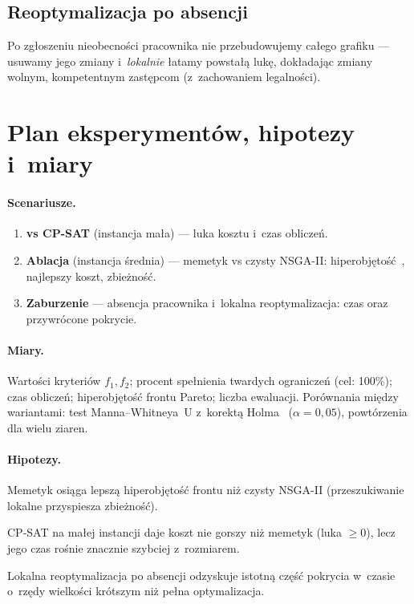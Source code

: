 \documentclass[11pt,a4paper]{article}
\begin{document}
\subsection{Reoptymalizacja po absencji}
Po zg\l oszeniu nieobecno\'sci pracownika nie przebudowujemy ca\l ego grafiku ---
usuwamy jego zmiany i~\emph{lokalnie} \l atamy powsta\l \k{a} luk\k{e}, dok\l adaj\k{a}c
zmiany wolnym, kompetentnym zast\k{e}pcom (z~zachowaniem legalno\'sci).

\section{Plan eksperyment\'ow, hipotezy i~miary}
\label{sec:plan}

\paragraph{Scenariusze.}
\begin{enumerate}[noitemsep]
  \item \textbf{vs CP-SAT} (instancja ma\l a) --- luka kosztu i~czas oblicze\'n.
  \item \textbf{Ablacja} (instancja \'srednia) --- memetyk vs czysty NSGA-II:
        hiperobj\k{e}to\'s\'c~\cite{zitzler2003hypervolume}, najlepszy koszt, zbie\.zno\'s\'c.
  \item \textbf{Zaburzenie} --- absencja pracownika i~lokalna reoptymalizacja:
        czas oraz przywr\'ocone pokrycie.
\end{enumerate}

\paragraph{Miary.} Warto\'sci kryteri\'ow $f_1,f_2$; procent spe\l nienia twardych
ogranicze\'n (cel: 100\%); czas oblicze\'n; hiperobj\k{e}to\'s\'c frontu Pareto;
liczba ewaluacji. Por\'ownania mi\k{e}dzy wariantami: test Manna--Whitneya~U
z~korekt\k{a} Holma~\cite{holm1979simple} ($\alpha=0{,}05$), powt\'orzenia dla wielu ziaren.

\paragraph{Hipotezy.}
\begin{description}[noitemsep]
  \item[H1] Memetyk osi\k{a}ga lepsz\k{a} hiperobj\k{e}to\'s\'c frontu ni\.z czysty
    NSGA-II (przeszukiwanie lokalne przyspiesza zbie\.zno\'s\'c).
  \item[H2] CP-SAT na ma\l ej instancji daje koszt nie gorszy ni\.z memetyk
    (luka $\ge 0$), lecz jego czas ro\'snie znacznie szybciej z~rozmiarem.
  \item[H3] Lokalna reoptymalizacja po absencji odzyskuje istotn\k{a} cz\k{e}\'s\'c
    pokrycia w~czasie o~rz\k{e}dy wielko\'sci kr\'otszym ni\.z pe\l na optymalizacja.
\end{description}
\end{document}
